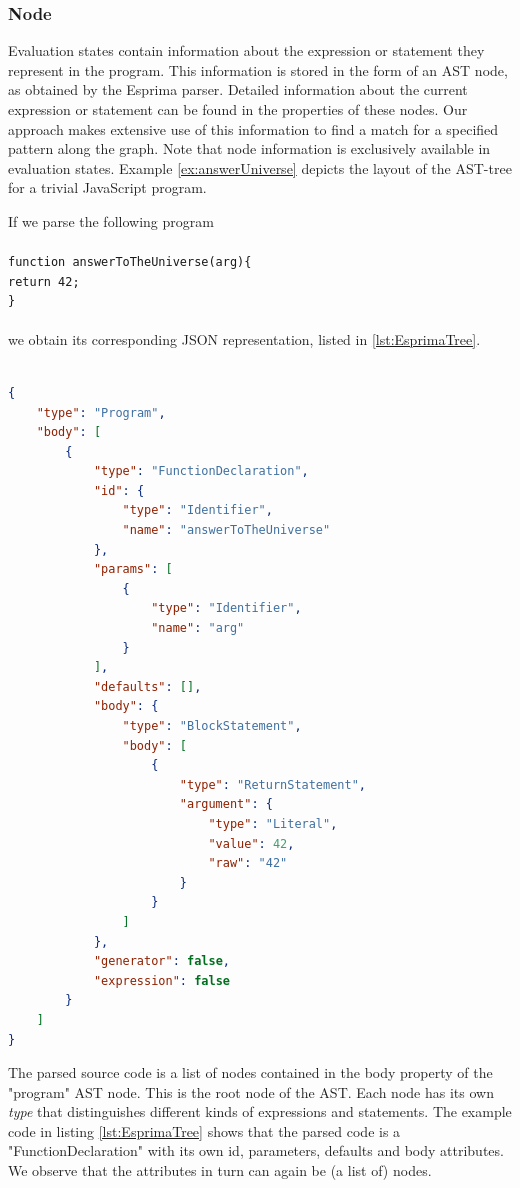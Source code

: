 \subsubsection*{Node}

Evaluation states contain information about the expression or statement they represent in the program. This information is stored in the form of an AST node, as obtained by the Esprima parser. Detailed information about the current expression or statement can be found in the properties of these nodes. Our approach makes extensive use of this information to find a match for a specified pattern along the graph. Note that node information is exclusively available in evaluation states. Example \ref{ex:answerUniverse} depicts the layout of the AST-tree for a trivial JavaScript program.

\begin{exmp}
\label{ex:answerUniverse}
If we parse the following program \\\\
\texttt{function answerToTheUniverse(arg)\{}\\
\phantom{ }\phantom{ }\phantom{ }\phantom{ }\texttt{return 42;}\\
\texttt{\}}\\
\\
we obtain its corresponding JSON representation, listed in \ref{lst:EsprimaTree}.
\\
\begin{lstlisting}[label={lst:EsprimaTree},language=JSON,caption=Parsed JavaScript program AST, mathescape=true]  % float=t?

{
    "type": "Program",
    "body": [
        {
            "type": "FunctionDeclaration",
            "id": {
                "type": "Identifier",
                "name": "answerToTheUniverse"
            },
            "params": [
                {
                    "type": "Identifier",
                    "name": "arg"
                }
            ],
            "defaults": [],
            "body": {
                "type": "BlockStatement",
                "body": [
                    {
                        "type": "ReturnStatement",
                        "argument": {
                            "type": "Literal",
                            "value": 42,
                            "raw": "42"
                        }
                    }
                ]
            },
            "generator": false,
            "expression": false
        }
    ]
}
\end{lstlisting}

The parsed source code is a list of nodes contained in the body property of the "program" AST node. This is the root node of the AST. Each node has its own \textit{type} that distinguishes different kinds of expressions and statements. The example code in listing \ref{lst:EsprimaTree} shows that the parsed code is a "FunctionDeclaration" with its own id, parameters, defaults and body attributes. We observe that the attributes in turn can again be (a list of) nodes.

\end{exmp}

